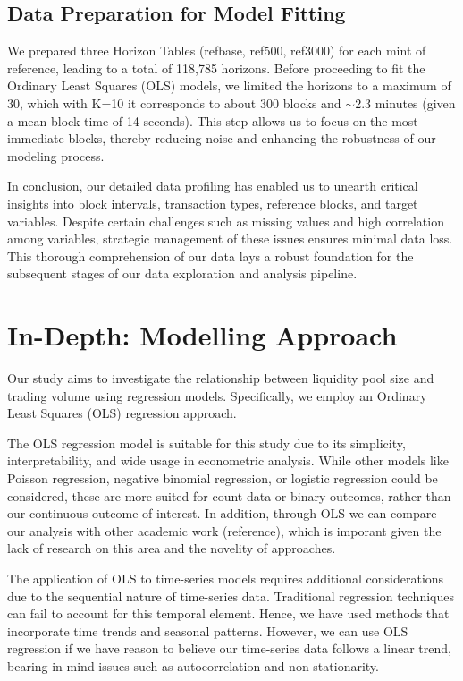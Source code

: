 \documentclass{article}
\begin{document}
\subsection{Data Preparation for Model Fitting}
We prepared three Horizon Tables (refbase, ref500, ref3000) for each mint of reference, leading to a total of 118,785 horizons. Before proceeding to fit the Ordinary Least Squares (OLS) models, we limited the horizons to a maximum of 30, which with K=10 it corresponds to about 300 blocks and $\sim$2.3 minutes (given a mean block time of 14 seconds). This step allows us to focus on the most immediate blocks, thereby reducing noise and enhancing the robustness of our modeling process.

In conclusion, our detailed data profiling has enabled us to unearth critical insights into block intervals, transaction types, reference blocks, and target variables. Despite certain challenges such as missing values and high correlation among variables, strategic management of these issues ensures minimal data loss. This thorough comprehension of our data lays a robust foundation for the subsequent stages of our data exploration and analysis pipeline.


\section*{\textbf{In-Depth: Modelling Approach}}
Our study aims to investigate the relationship between liquidity pool size and trading volume using regression models. Specifically, we employ an Ordinary Least Squares (OLS) regression approach. 

The OLS regression model is suitable for this study due to its simplicity, interpretability, and wide usage in econometric analysis. While other models like Poisson regression, negative binomial regression, or logistic regression could be considered, these are more suited for count data or binary outcomes, rather than our continuous outcome of interest.
In addition, through OLS we can compare our analysis with other academic work (reference), which is imporant given the lack of research on this area and the novelity of approaches.

The application of OLS to time-series models requires additional considerations due to the sequential nature of time-series data. Traditional regression techniques can fail to account for this temporal element. Hence, we have used methods that incorporate time trends and seasonal patterns. However, we can use OLS regression if we have reason to believe our time-series data follows a linear trend, bearing in mind issues such as autocorrelation and non-stationarity.
\end{document}
